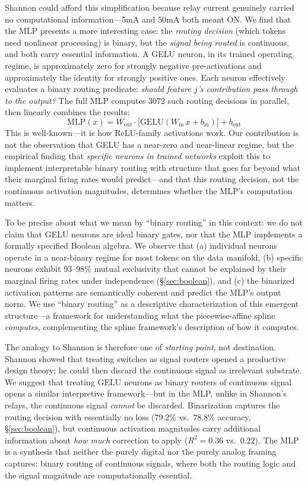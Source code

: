 \documentclass{article}
\begin{document}
Shannon could afford this simplification because relay current genuinely carried no
computational information---5mA and 50mA both meant ON. We find that the MLP presents a
more interesting case: the \emph{routing decision} (which tokens need nonlinear processing) is
binary, but the \emph{signal being routed} is continuous, and both carry essential information.
A GELU neuron, in its trained operating regime, is approximately zero for strongly negative
pre-activations and approximately the identity for strongly positive ones. Each neuron
effectively evaluates a binary routing predicate: \emph{should feature $j$'s contribution
pass through to the output?} The full MLP computes 3072 such routing decisions in parallel,
then linearly combines the results:
\begin{equation}
\text{MLP}(x) = W_{\text{out}} \cdot \big[\text{GELU}(W_{\text{in}}\, x + b_{\text{in}})\big] + b_{\text{out}}
\end{equation}
This is well-known---it is how ReLU-family activations work. Our contribution is
not the observation that GELU has a near-zero and near-linear regime, but the empirical finding
that \emph{specific neurons in trained networks} exploit this to implement interpretable
binary routing with structure that goes far beyond what their marginal firing rates would
predict---and that this routing decision, not the continuous activation magnitudes, determines
whether the MLP's computation matters.

To be precise about what we mean by ``binary routing'' in this context: we do not claim that GELU
neurons are ideal binary gates, nor that the MLP implements a formally specified Boolean
algebra. We observe that (a) individual neurons operate in a near-binary regime for most
tokens on the data manifold, (b) specific neurons exhibit 93--98\% mutual exclusivity that
cannot be explained by their marginal firing rates under independence
(\S\ref{sec:boolean}), and (c) the binarized activation patterns are
semantically coherent and predict the MLP's output norm. We use ``binary routing'' as a
descriptive characterization of this emergent structure---a framework for understanding what
the piecewise-affine spline \emph{computes}, complementing the spline framework's description
of how it computes.

The analogy to Shannon is therefore one of \emph{starting point}, not destination.
Shannon showed that treating switches as signal routers opened a productive design theory;
he could then discard the continuous signal as irrelevant substrate. We suggest that treating
GELU neurons as binary routers of continuous signal opens a similar interpretive framework---but
in the MLP, unlike in Shannon's relays, the continuous signal \emph{cannot} be discarded.
Binarization captures the routing decision with essentially no loss (79.2\% vs.\ 78.8\%
accuracy, \S\ref{sec:boolean}), but continuous activation magnitudes carry additional
information about \emph{how much} correction to apply ($R^2 = 0.36$ vs.\ $0.22$).
The MLP is a synthesis that neither the purely digital nor the purely analog framing captures:
binary routing of continuous signals, where both the routing logic and the signal magnitude
are computationally essential.
\end{document}
